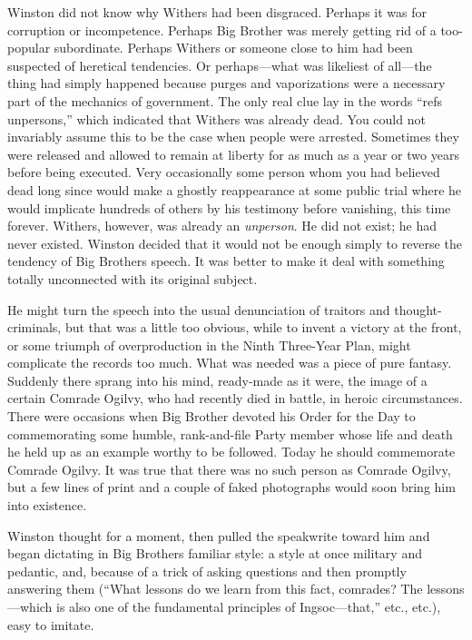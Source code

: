 Winston did not know why Withers had been disgraced. Perhaps it was for
corruption or incompetence. Perhaps Big Brother was merely getting rid
of a too-popular subordinate. Perhaps Withers or someone close to him
had been suspected of heretical tendencies. Or perhaps---what was
likeliest of all---the thing had simply happened because purges and
vaporizations were a necessary part of the mechanics of government. The
only real clue lay in the words ``refs unpersons,'' which indicated that
Withers was already dead. You could not invariably assume this to be the
case when people were arrested. Sometimes they were released and allowed
to remain at liberty for as much as a year or two years before being
executed. Very occasionally some person whom you had believed dead long
since would make a ghostly reappearance at some public trial where he
would implicate hundreds of others by his testimony before vanishing,
this time forever. Withers, however, was already an \emph{unperson}. He
did not exist; he had never existed. Winston decided that it would not
be enough simply to reverse the tendency of Big
Brother\textquotesingle s speech. It was better to make it deal with
something totally unconnected with its original subject.

He might turn the speech into the usual denunciation of traitors and
thought-criminals, but that was a little too obvious, while to invent a
victory at the front, or some triumph of overproduction in the Ninth
Three-Year Plan, might complicate the records too much. What was needed
was a piece of pure fantasy. Suddenly there sprang into his mind,
ready-made as it were, the image of a certain Comrade Ogilvy, who had
recently died in battle, in heroic circumstances. There were occasions
when Big Brother devoted his Order for the Day to commemorating some
humble, rank-and-file Party member whose life and death he held up as an
example worthy to be followed. Today he should commemorate Comrade
Ogilvy. It was true that there was no such person as Comrade Ogilvy, but
a few lines of print and a couple of faked photographs would soon bring
him into existence.

Winston thought for a moment, then pulled the speakwrite toward him and
began dictating in Big Brothers familiar style: a style at once military
and pedantic, and, because of a trick of asking questions and then
promptly answering them (``What lessons do we learn from this fact,
comrades? The lessons---which is also one of the fundamental principles
of Ingsoc---that,'' etc., etc.), easy to imitate.

